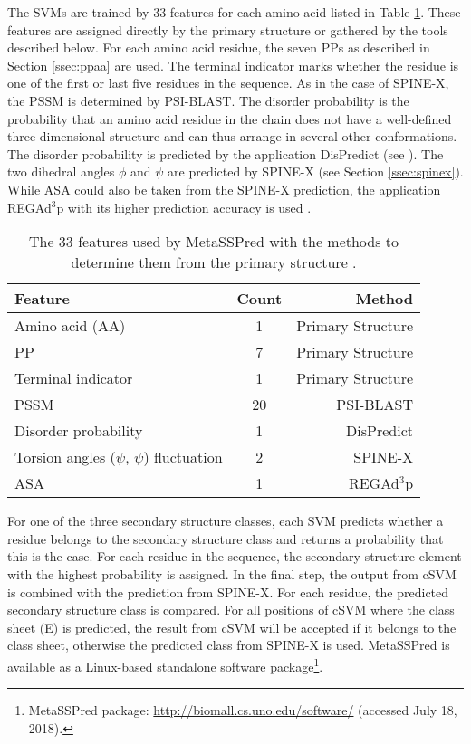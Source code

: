 The \acp{SVM} are trained by 33 features for each amino acid listed in Table \ref{tab:MetaPred}. These features are assigned directly by the primary structure or gathered by the tools described below.  
For each amino acid residue, the seven \acp{PP} as described in Section \ref{ssec:ppaa} are used. The terminal indicator marks whether the residue is one of the first or last five residues in the sequence. As in the case of SPINE-X, the \ac{PSSM} is determined by PSI-BLAST. The disorder probability is the probability that an amino acid residue in the chain does not have a well-defined three-dimensional structure and can thus arrange in several other conformations. The disorder probability is predicted by the application DisPredict (see \cite{Iqbal.2015}). 
The two dihedral angles $\phi$ and $\psi$ are predicted by SPINE-X (see Section \ref{ssec:spinex}).
While \ac{ASA} could also be taken from the SPINE-X prediction, the application REGAd$^3$p with its higher prediction accuracy is used \cite{Iqbal.2015_2}.

\begin{table}[h]
\centering
\begin{tabular}{|l|c|r|} \hline
Feature                          & Count & Method           \\ \hline
Amino acid (AA)                      & 1	 &    Primary Structure				\\
\acf{PP}        & 7     &          Primary Structure           				\\
Terminal indicator               & 1     &    Primary Structure          	\\  
\acf{PSSM} & 20    &  PSI-BLAST       \\	  
Disorder probability             & 1     &  DisPredict      \\
Torsion angles ($\psi$, $\psi$) fluctuation       & 2     &  SPINE-X  \\
\acf{ASA}          & 1     &  REGAd$^3$p    		\\ \hline
\end{tabular}
\caption[The 33 features used by MetaSSPred.]{The 33 features used by MetaSSPred with the methods to determine them from the primary structure \cite{NasrulIslam.2016}.}
\label{tab:MetaPred}
\end{table}

For one of the three secondary structure classes, each \ac{SVM} predicts whether a residue belongs to the secondary structure class and returns a probability that this is the case. 
For each residue in the sequence, the secondary structure element with the highest probability is assigned. 
In the final step, the output from cSVM is combined with the prediction from SPINE-X. For each residue, the predicted secondary structure class is compared. 
For all positions of cSVM where the class sheet (E) is predicted, 
the result from cSVM will be accepted if it belongs to the class sheet, otherwise the predicted class from SPINE-X is used. 
MetaSSPred is available as a Linux-based standalone software package\footnote{MetaSSPred package: \url{http://biomall.cs.uno.edu/software/} (accessed July 18, 2018).}.


